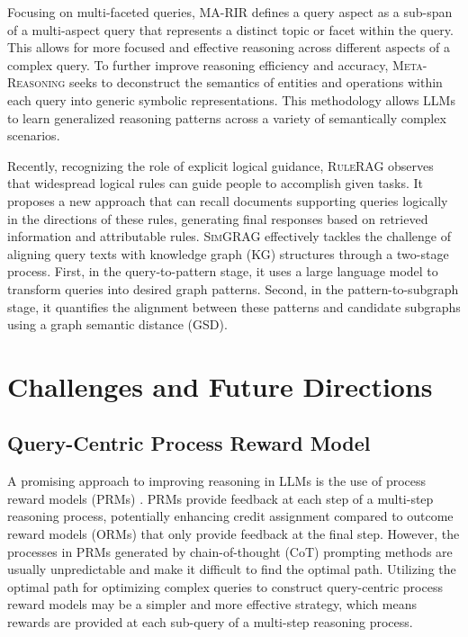 \documentclass[11pt]{article}
\begin{document}
Focusing on multi-faceted queries, \textsc{MA-RIR} \cite{MA-RIR} defines a query aspect as a sub-span of a multi-aspect query that represents a distinct topic or facet within the query. This allows for more focused and effective reasoning across different aspects of a complex query.
To further improve reasoning efficiency and accuracy, \textsc{Meta-Reasoning} \cite{Meta-Reasoning} seeks to deconstruct the semantics of entities and operations within each query into generic symbolic representations. This methodology allows LLMs to learn generalized reasoning patterns across a variety of semantically complex scenarios.

Recently, recognizing the role of explicit logical guidance, \textsc{RuleRAG} \cite{RuleRAG} observes that widespread logical rules can guide people to accomplish given tasks. It proposes a new approach that can recall documents supporting queries logically in the directions of these rules, generating final responses based on retrieved information and attributable rules.
\textsc{SimGRAG} \cite{SimGRAG} effectively tackles the challenge of aligning query texts with knowledge graph (KG) structures through a two-stage process. First, in the query-to-pattern stage, it uses a large language model to transform queries into desired graph patterns. Second, in the pattern-to-subgraph stage, it quantifies the alignment between these patterns and candidate subgraphs using a graph semantic distance (GSD).

\section{Challenges and Future Directions}\label{Challenges}


\subsection{Query-Centric Process Reward Model}
A promising approach to improving reasoning in LLMs is the use of process reward models (PRMs) \cite{prms_1, prms_2}. PRMs provide feedback at each step of a multi-step reasoning process, potentially enhancing credit assignment compared to outcome reward models (ORMs) that only provide feedback at the final step. However, the processes in PRMs generated by chain-of-thought (CoT) prompting methods are usually unpredictable and make it difficult to find the optimal path. Utilizing the optimal path for optimizing complex queries to construct query-centric process reward models may be a simpler and more effective strategy, which means rewards are provided at each sub-query of a multi-step reasoning process.
\end{document}

